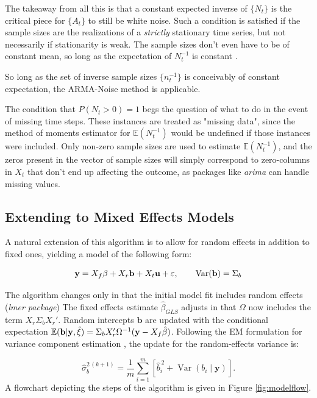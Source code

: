 The takeaway from all this is that a constant expected inverse of $\{N_t\}$ is the critical piece for $\{A_t\}$ to still be white noise.
Such a condition is satisfied if the sample sizes are the realizations of a \emph{strictly} stationary time series,
but not necessarily if stationarity is weak. The sample sizes don't even have to be of constant mean, 
so long as the expectation of $N_t^{-1}$ is constant \cite{Argentino2026}.

So long as the set of inverse sample sizes $\{n_t^{-1}\}$ is conceivably of constant expectation, the ARMA-Noise method is applicable.

The condition that $P(N_t > 0) = 1$ begs the question of what to do in the event of missing time steps. These instances are 
treated as "missing data", since the method of moments estimator for $\mathbb{E}(N_t^{-1})$ would be undefined if those
instances were included. Only non-zero sample sizes are used to estimate $\mathbb{E}(N_t^{-1})$, and the zeros present 
in the vector of sample sizes will simply correspond to zero-columns in $X_t$ that don't end up affecting 
the outcome, as packages like \textit{arima} can handle missing values.


\subsection{Extending to Mixed Effects Models}

A natural extension of this algorithm is to allow for random effects in addition to fixed ones,
yielding a model of the following form:

\begin{equation}
    \mathbf{y} = X_f\beta + X_r\mathbf{b} + X_t\mathbf{u} + \varepsilon, \qquad     \text{Var}(\mathbf{b}) = \Sigma_b
\end{equation}






The algorithm changes only in that the initial model fit includes random effects (\textit{lmer package}) \cite{Bates2015}
The fixed effects estimate $\hat{\beta}_{GLS}$ adjusts in that $\Omega$ now includes the 
term $X_r\Sigma_bX_r'$. Random intercepts $\mathbf{b}$ are updated with the 
conditional expectation $\mathbb{E}(\mathbf{b}|\mathbf{y}, \hat{\xi}) = \Sigma_b X_r' \Omega^{-1}(\mathbf{y} - X_f\hat{\beta})$.
Following the EM formulation for variance component estimation
\citep{laird1982variance}, the update for the random-effects
variance is:

\[
\widehat{\sigma}_b^{2\,(k+1)}
=
\frac{1}{m}
\sum_{i=1}^m
\left[
\widehat{b}_i^{\,2}
+
\operatorname{Var}(b_i \mid \mathbf{y})
\right].
\]
A flowchart depicting the steps of the algorithm is given in 
Figure \ref{fig:modelflow}.


